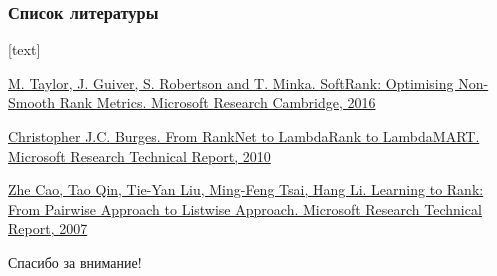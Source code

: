 \documentclass[10pt]{beamer}
\begin{document}
\begin{frame}
\frametitle{Список литературы}
\begin{thebibliography}{1}
[text]

 \href{https://www.microsoft.com/en-us/research/publication/softrank-optimising-non-smooth-rank-metrics/}
{M. Taylor, J. Guiver, S. Robertson and T. Minka. SoftRank: Optimising Non-Smooth Rank Metrics. Microsoft Research Cambridge, 2016}

 \href{https://www.microsoft.com/en-us/research/publication/from-ranknet-to-lambdarank-to-lambdamart-an-overview/}
{Christopher J.C. Burges. From RankNet to LambdaRank to LambdaMART. Microsoft Research Technical Report, 2010}

 \href{https://www.microsoft.com/en-us/research/publication/learning-to-rank-from-pairwise-approach-to-listwise-approach/}
{Zhe Cao, Tao Qin, Tie-Yan Liu, Ming-Feng Tsai, Hang Li. Learning to Rank: From Pairwise Approach to Listwise Approach. Microsoft Research Technical Report, 2007}

\end{thebibliography}
\end{frame}



\begin{frame}
\begin{center}
\Huge Спасибо за внимание!
\end{center}
\end{frame}
\end{document}
